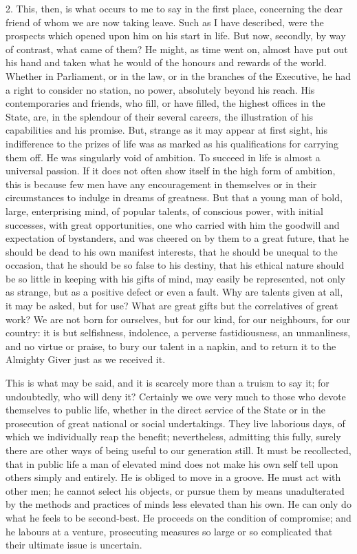 2. This, then, is what occurs to me to say in the
first place, concerning the dear friend of whom we are
now taking leave. Such as I have described, were the
prospects which opened upon him on his start in life. But
now, secondly, by way of contrast, what came of them? He
might, as time went on, almost have put out his hand and
taken what he would of the honours and rewards of the
world. Whether in Parliament, or in the law, or in the
branches of the Executive, he had a right to consider no
station, no power, absolutely beyond his reach. His
contemporaries and friends, who fill, or have filled, the
highest offices in the State, are, in the splendour of
their several careers, the illustration of his
capabilities and his promise. But, strange as it may
appear at first sight, his indifference to the prizes of
life was as marked as his qualifications for carrying
them off. He was singularly void of ambition. To succeed
in life is almost a universal passion. If it does not
often show itself in the high form of ambition, this is
because few men have any encouragement in themselves or
in their circumstances to indulge in dreams of greatness. But that a young man of bold, large,
enterprising mind, of popular talents, of conscious
power, with initial successes, with great opportunities,
one who carried with him the goodwill and expectation of
bystanders, and was cheered on by them to a great future,
that he should be dead to his own manifest interests,
that he should be unequal to the occasion, that he should
be so false to his destiny, that his ethical nature
should be so little in keeping with his gifts of mind,
may easily be represented, not only as strange, but as a
positive defect or even a fault. Why are talents given at
all, it may be asked, but for use? What are great gifts
but the correlatives of great work? We are not born for
ourselves, but for our kind, for our neighbours, for our
country: it is but selfishness, indolence, a perverse
fastidiousness, an unmanliness, and no virtue or praise,
to bury our talent in a napkin, and to return it to the
Almighty Giver just as we received it.

This is what may be said, and it is scarcely more than
a truism to say it; for undoubtedly, who will deny it?
Certainly we owe very much to those who devote themselves
to public life, whether in the direct service of the
State or in the prosecution of great national or social
undertakings. They live laborious days, of which we
individually reap the benefit; nevertheless, admitting
this fully, surely there are other ways of being useful
to our generation still. It must be recollected, that in
public life a man of elevated mind does not make his own
self tell upon others simply and entirely. He is obliged
to move in a groove. He must act with other men; he
cannot select his objects, or pursue them by means
unadulterated by the methods and practices of minds less
elevated than his own. He can only do what he feels to be
second-best. He proceeds on the condition of compromise;
and he labours at a venture, prosecuting measures so
large or so complicated that their ultimate issue is
uncertain.

